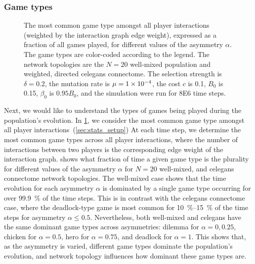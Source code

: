 \documentclass[pdflatex,lineno,referee,sn-mathphys-ay]{sn-jnl}
\begin{document}
\subsubsection{Game types}
\begin{figure}
  \centering
  
  \caption{
    The most common game type amongst all player interactions
    (weighted by the interaction graph edge weight),
    expressed as a fraction of all games played,
    for different values of the asymmetry $\alpha$.
    The game types are color-coded according to the legend.
    The network topologies are the
    $N=20$ well-mixed population
    and
    weighted, directed \gls{celegans} connectome.
    The selection strength is $\delta=0.2$,
    the mutation rate is $\mu=\num{1E-4}$,
    the cost $c$ is \num{0.1},
    $B_0$ is \num{0.15},
    $\beta_0$ is $\num{0.95} B_0$,
    and the simulation were run for \num{8E6} time steps.
  }
  \label{fig:game-type}
\end{figure}

Next, we would like to understand the types of games being played
during the population's evolution.
In \cref{fig:game-type}, we consider the most common game type
amongst all player interactions~(\cf \cref{sec:stats_setup})
At each time step, we determine the most common game types
across all player interactions,
where the number of interactions between two players
is the corresponding edge weight of the interaction graph.
 shows what fraction of time
a given game type is the plurality for different values
of the asymmetry $\alpha$ for
$N=20$ well-mixed,
and
\gls{celegans} connectome
network topologies.
The  well-mixed case
shows that the time evolution for each asymmetry $\alpha$
is dominated by a single game type
occurring for over \SI{99.9}{\percent} of the time steps.
This is in contrast with the
 \gls{celegans} connectome case,
where the deadlock-type game is most common
for \SIrange{10}{15}{\percent} of the time steps
for asymmetry $\alpha \le 0.5$.
Nevertheless, both  well-mixed
and  \gls{celegans}
have the same dominant game types
across asymmetries:
dilemma for $\alpha = 0, 0.25$, chicken for $\alpha = 0.5$,
hero for $\alpha = 0.75$, and deadlock for $\alpha = 1$.
This shows that, as the asymmetry is varied,
different game types dominate the population's evolution,
and network topology influences how dominant these game types are.
\end{document}

